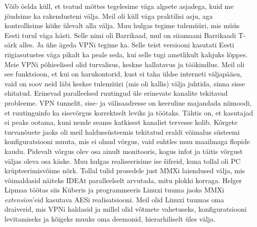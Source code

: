 
Võib öelda küll, et teatud mõttes tegelesime väga
algsete asjadega, kuid me jõudsime ka rakendusteni välja. Meil oli küll 
väga praktilisi asju, aga kontrollisime kõike 
ülevalt alla välja. Muu hulgas tegime tulemüüri, mis müüs Eesti turul väga 
hästi. Selle nimi oli Barrikaad, mul on 
siiamaani Barrikaadi T-särk alles. Ja ühe ägeda VPNi tegime ka. Selle teist versiooni kasutati Eesti riigiasutustes 
väga pikalt ka peale seda, kui selle tugi ametlikult kahjuks
lõppes. Meie VPNi põhieelised olid 
turvalisus, keskne hallatavus ja töökindlus. Meil oli see funktsioon, et kui 
on harukontorid, kust ei taha üldse interneti väljapääsu, vaid on soov neid läbi 
keskse tulemüüri (mis oli kallis) välja juhtida, sinna sisse 
ehitatud. Erinevad paralleelsed ruutingud üle erinevate kanalite tekitavad probleeme. VPN tunnelit, sise- ja 
välisaadresse on keeruline majandada niimoodi, et ruutinguinfo ka 
sisevõrgus korrektselt leviks ja töötaks. Tähtis on, et kasutajad 
ei peaks ootama, kuni nende seanss katkisest kanalist tervesse kolib. 
Kõrgete turvanõuete jaoks oli meil haldussüsteemis tekitatud eraldi 
võimalus süsteemi konfiguratsiooni muuta, mis ei olnud võrgus, vaid 
suhtles muu maailmaga flopide kaudu. Pidevalt võrgus olev osa ainult monitooris, kogus infot ja 
täitis võrgust väljas oleva osa käske. Muu hulgas realiseerisime ise šifreid, kuna tollal oli PC krüpteerimisvõime nõrk. Tollal tulid prosedele just MMXi laiendused välja, 
mis võimaldasid näiteks IDEAt paralleelselt arvutada, mitu plokki korraga. Helger Lipmaa töötas siis Küberis ja 
programmeeris Linuxi tuuma jaoks MMXi \emph{extension}'eid kasutava 
AESi  
realisatsiooni. Meil olid Linuxi tuumas oma draiverid, mis 
VPNi haldasid ja millel olid võtmete vahetuseks, konfiguratsiooni 
levitamiseks ja kõigeks muuks oma deemonid, hierarhiliselt üles välja.

